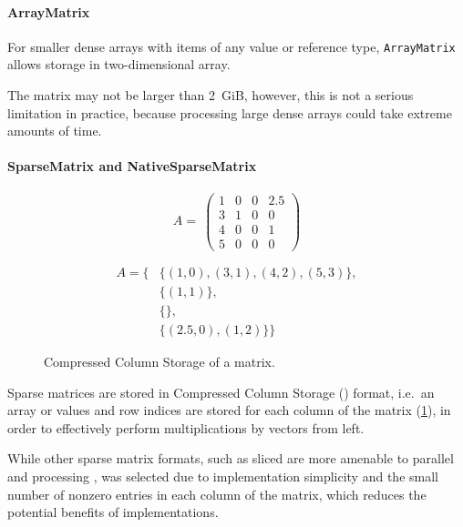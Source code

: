 \paragraph{ArrayMatrix}

For smaller dense arrays with items of any value or reference type,
\texttt{ArrayMatrix} allows storage in two-dimensional 
array.

The matrix may not be larger than 2~GiB, however, this is not a
serious limitation in practice, because processing large dense arrays
could take extreme amounts of time.

\paragraph{SparseMatrix and NativeSparseMatrix}

\begin{figure}
  \centering
  \begin{minipage}{0.5\linewidth}
    \begin{equation}
      A = \
      \begin{pmatrix}
        1 & 0 & 0 & 2.5 \\
        3 & 1 & 0 & 0 \\
        4 & 0 & 0 & 1 \\
        5 & 0 & 0 & 0
      \end{pmatrix}
    \end{equation}
  \end{minipage}%
  \begin{minipage}{0.5\linewidth}
    \begin{align}
      A = \{&\{(1,0), (3,1), (4,2), (5,3)\}, \\
      &\{(1,1)\}, \\
      &\{\}, \\
      &\{(2.5,0), (1,2)\}\}
    \end{align}
  \end{minipage}
  \caption{Compressed Column Storage of a matrix.}
  \label{fig:genstor:matrix:ccs}
\end{figure}

Sparse matrices are stored in Compressed Column Storage ()
format, i.e.~an array or values and row indices are stored for each
column of the matrix (\cref{fig:genstor:matrix:ccs}), in order to
effectively perform multiplications by vectors from left.

While other sparse matrix formats, such as sliced  are
more amenable to parallel and \textls{SIMD} processing
\citet{DBLP:journals/corr/KreutzerHWFB13},  was selected
due to implementation simplicity and the small number of nonzero
entries in each column of the matrix, which reduces the potential
benefits of \textls{SIMD} implementations.

